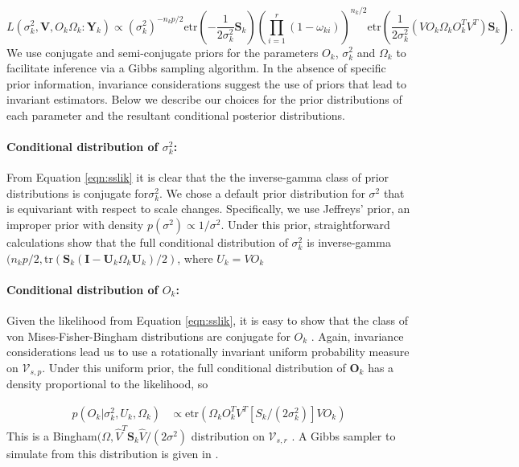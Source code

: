 \documentclass[12pt]{article}
\newcommand{\bl}[1]{{\mathbf #1}}
\newcommand{\tr}{\text{tr}}
\newcommand{\etr}{\text{etr}}
\begin{document}
\begin{equation}
 L(\sigma_k^2,\bl V , O_k \Omega_k : \bl Y_k) \propto
    (\sigma_k^2)^{-n_kp/2}\etr(-\frac{1}{2\sigma_k^2}\mathbf{S}_k)\left(\prod_{i=1}^r(1-\omega_{ki})
   \right) ^{n_k/2}
   \etr(\frac{1}{2\sigma_k^2}(VO_k\Omega_kO_k^TV^T)\mathbf{S}_k).
\label{eqn:sslik}
\end{equation}
%
\noindent We use conjugate and semi-conjugate priors for the parameters $O_k$,
$\sigma^2_k$ and $\Omega_k$ to facilitate inference via a Gibbs
sampling algorithm.  In the absence of specific prior information,
invariance considerations suggest the use of priors that lead to
invariant estimators.  Below we describe our choices for the prior
distributions of each parameter and the resultant conditional posterior
distributions.

\paragraph{Conditional distribution of $\sigma_k^2$:}

From Equation \ref{eqn:sslik} it is clear that the the inverse-gamma
class of prior distributions is conjugate for$\sigma_k^2$.  We chose a
default prior distribution for $\sigma^2$ that is equivariant with
respect to scale changes.  Specifically, we use Jeffreys' prior, an
improper prior with density $p(\sigma^2) \propto 1/\sigma^2 $.  Under
this prior, straightforward calculations show that the full
conditional distribution of $\sigma_k^2$ is
inverse-gamma$( n_k p/2 , \tr(\bl S_k(\bl I -\bl U_k\Omega_k\bl
U_k)/2)$, where $U_k = VO_k$

\paragraph{Conditional distribution of $O_k$:} Given the likelihood
from Equation \ref{eqn:sslik}, it is easy to show that the class of
von Mises-Fisher-Bingham distributions are conjugate for $O_k$
\citep{Hoff2009, Hoff2012}.  Again, invariance considerations
lead us to use a rotationally invariant uniform probability measure on
$\mathcal V_{s,p}$.  Under this uniform prior, the full conditional
distribution of $\bl O_k$ has a density proportional to the
likelihood, so

\begin{align}
\label{lik_vo}
 p(O_k | \sigma^2_k, U_k, \Omega_k) & \propto \etr(\Omega_kO^T_kV^T[S_k/(2\sigma^2_k)]VO_k)
\end{align}
%
\noindent This is a Bingham$(\Omega, \hat{V}^T \bl S_k \hat{V}/(2\sigma^2)$
distribution on $\mathcal V_{s, r}$ \citep{Khatri1977}. A
Gibbs sampler to simulate from this distribution is given in
\citet{Hoff2012}.  
\end{document}
